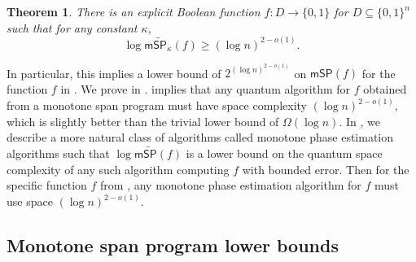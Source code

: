 \documentclass[11pt]{article}
\numberwithin{equation}{section}
\newtheorem{theorem}{Theorem}[section]
\theoremstyle{definition}
\theoremstyle{plain}
\begin{document}
\begin{theorem}\label{thm:explicit}
There is an explicit Boolean function $f:D\rightarrow\{0,1\}$ for $D\subseteq \{0,1\}^n$ such that for any constant $\kappa$,
$$\log\mathsf{m}\widetilde{\mathsf{SP}}_{\kappa}(f)\geq (\log n)^{2-o(1)}.$$
\end{theorem}
In particular, this implies a lower bound of $2^{(\log n)^{2-o(1)}}$ on $\mathsf{mSP}(f)$ for the function $f$ in . 
We prove  in . 
 implies that any quantum algorithm for $f$ obtained from a monotone span program must have space complexity $(\log n)^{2-o(1)}$, which is slightly better than the trivial lower bound of $\Omega(\log n)$. In , we describe a more natural class of algorithms called monotone phase estimation algorithms such that $\log\mathsf{m}\widetilde{\mathsf{SP}}(f)$ is a lower bound on the quantum space complexity of any such algorithm computing $f$ with bounded error. Then for the specific function $f$ from , any monotone phase estimation algorithm for $f$ must use space $(\log n)^{2-o(1)}$. 


\subsection{Monotone span program lower bounds}\label{sec:monotone-lower-bounds}
\end{document}
